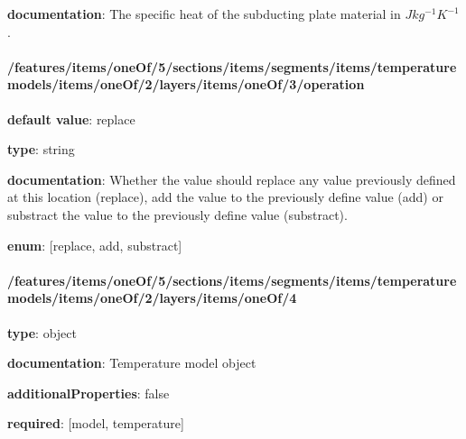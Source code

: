 \begin{itemized}
\item {\bf documentation}: The specific heat of the subducting plate material in $J kg^{-1} K^{-1}$.
\end{itemized}\paragraph{/features/items/oneOf/5/sections/items/segments/items/temperature models/items/oneOf/2/layers/items/oneOf/3/operation} \begin{itemized}
\item {\bf default value}: replace
\item {\bf type}: string
\item {\bf documentation}: Whether the value should replace any value previously defined at this location (replace), add the value to the previously define value (add) or substract the value to the previously define value (substract).
\item {\bf enum}: [replace, add, substract]\end{itemized}\paragraph{/features/items/oneOf/5/sections/items/segments/items/temperature models/items/oneOf/2/layers/items/oneOf/4} \begin{itemized}
\item {\bf type}: object
\item {\bf documentation}: Temperature model object
\item {\bf additionalProperties}: false
\item {\bf required}: [model, temperature]\end{itemized}
